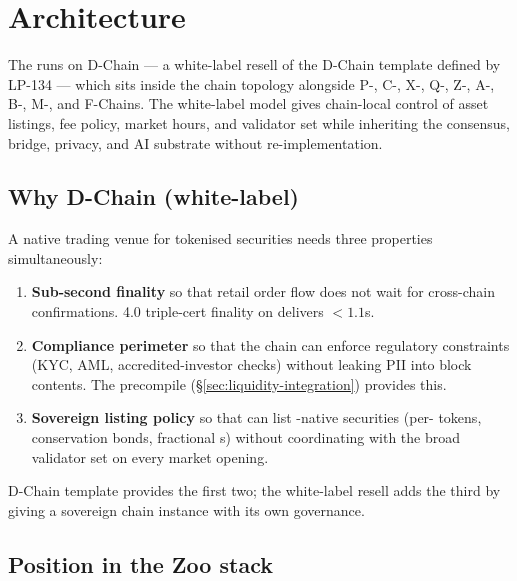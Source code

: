\section{Architecture}
\label{sec:architecture}

The \Zoo{} \DEX{} runs on \Zoo{} D-Chain --- a white-label resell of
the \Lux{} D-Chain template defined by LP-134 \cite{lp-134} --- which
sits inside the \Lux{} chain topology alongside P-, C-, X-, Q-, Z-,
A-, B-, M-, and F-Chains. The white-label model gives \Zoo{} chain-local
control of asset listings, fee policy, market hours, and validator set
while inheriting the \Lux{} consensus, bridge, privacy, and AI
substrate without re-implementation.

\subsection{Why D-Chain (white-label)}

A native trading venue for tokenised securities needs three properties
simultaneously:

\begin{enumerate}[leftmargin=1.4em]
  \item \textbf{Sub-second finality} so that retail order flow does not
        wait for cross-chain confirmations. \Quasar{} 4.0 triple-cert
        finality on \Lux{} \cite{lp-020} delivers $<1.1$s.
  \item \textbf{Compliance perimeter} so that the chain can enforce
        regulatory constraints (KYC, AML, accredited-investor checks)
        without leaking PII into block contents. The \Liquidity{}
        precompile (\S\ref{sec:liquidity-integration}) provides this.
  \item \textbf{Sovereign listing policy} so that \Zoo{} can list
        \Zoo{}-native securities (per-\LLM{} tokens, conservation
        bonds, fractional \NFT{}s) without coordinating with the broad
        \Lux{} validator set on every market opening.
\end{enumerate}

\Lux{} D-Chain template provides the first two; the white-label resell
adds the third by giving \Zoo{} a sovereign chain instance with its own
governance.

\subsection{Position in the Zoo stack}

